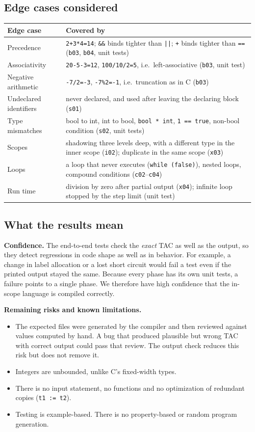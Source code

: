 \documentclass[11pt,letterpaper]{article}
\newcommand{\code}[1]{\texttt{#1}}
\begin{document}
\subsection{Edge cases considered}
\begin{tabularx}{\linewidth}{>{\raggedright}p{3.8cm} X}
\toprule
\textbf{Edge case} & \textbf{Covered by} \\
\midrule
Precedence & \code{2+3*4=14}; \code{\&\&} binds tighter than \code{||}; \code{+} binds tighter than \code{==} (\code{b03}, \code{b04}, unit tests) \\
Associativity & \code{20-5-3=12}, \code{100/10/2=5}, i.e.\ left-associative (\code{b03}, unit test) \\
Negative arithmetic & \code{-7/2=-3}, \code{-7\%2=-1}, i.e.\ truncation as in C (\code{b03}) \\
Undeclared identifiers & never declared, and used after leaving the declaring block (\code{s01}) \\
Type mismatches & bool to int, int to bool, \code{bool * int}, \code{1 == true}, non-bool condition (\code{s02}, unit tests) \\
Scopes & shadowing three levels deep, with a different type in the inner scope (\code{i02}); duplicate in the same scope (\code{x03}) \\
Loops & a loop that never executes (\code{while (false)}), nested loops, compound conditions (\code{c02}--\code{c04}) \\
Run time & division by zero after partial output (\code{x04}); infinite loop stopped by the step limit (unit test) \\
\bottomrule
\end{tabularx}

\subsection{What the results mean}
\textbf{Confidence.} The end-to-end tests check the \emph{exact} TAC as well as the output, so they detect regressions in code shape as well as in behavior. For example, a change in label allocation or a lost short circuit would fail a test even if the printed output stayed the same. Because every phase has its own unit tests, a failure points to a single phase. We therefore have high confidence that the in-scope language is compiled correctly.

\textbf{Remaining risks and known limitations.}
\begin{itemize}
  \item The expected files were generated by the compiler and then reviewed against values computed by hand. A bug that produced plausible but wrong TAC with correct output could pass that review. The output check reduces this risk but does not remove it.
  \item Integers are unbounded, unlike C's fixed-width types.
  \item There is no input statement, no functions and no optimization of redundant copies (\code{t1 := t2}).
  \item Testing is example-based. There is no property-based or random program generation.
\end{itemize}
\end{document}
